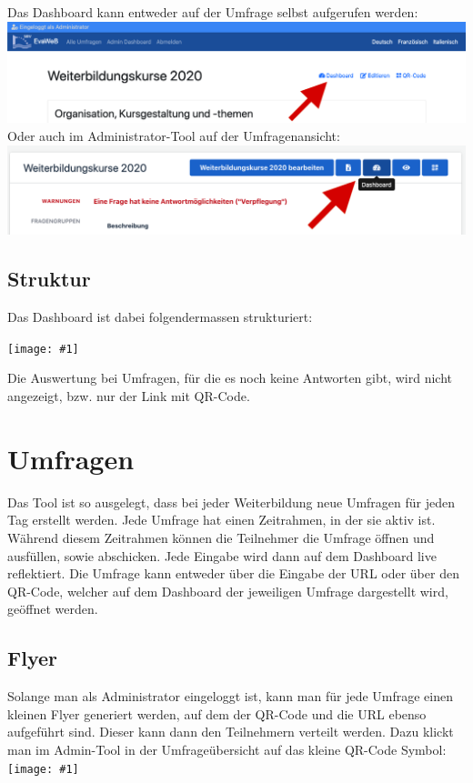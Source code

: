 \documentclass{article}
\newcommand{\inlineimage}[1]{
    \texttt{[image: \#1]}
}
\begin{document}
\begin{flushleft}
Das Dashboard kann entweder auf der Umfrage selbst aufgerufen werden:
\\[0.2cm]
\includegraphics[width=\textwidth]{images/dashboard_link_beispiel_1.png}
\\[0.7cm]
Oder auch im Administrator-Tool auf der Umfragenansicht:
\\[0.2cm]
\includegraphics[width=\textwidth]{images/dashboard_link_beispiel_2.png}
\end{flushleft}

\subsection{Struktur}
Das Dashboard ist dabei folgendermassen strukturiert:

\inlineimage{images/survey.png}
Die Auswertung bei Umfragen, für die es noch keine Antworten gibt, wird nicht angezeigt, bzw. nur der Link mit QR-Code.


\pagebreak
\section{Umfragen}
Das Tool ist so ausgelegt, dass bei jeder Weiterbildung neue Umfragen für jeden Tag erstellt werden. 
Jede Umfrage hat einen Zeitrahmen, in der sie aktiv ist. 
Während diesem Zeitrahmen können die Teilnehmer die Umfrage öffnen und ausfüllen, sowie abschicken.
Jede Eingabe wird dann auf dem Dashboard live reflektiert.
Die Umfrage kann entweder über die Eingabe der URL oder über den QR-Code, welcher auf dem Dashboard der jeweiligen Umfrage
dargestellt wird, geöffnet werden. 

\pagebreak
\subsection{Flyer}
Solange man als Administrator eingeloggt ist, kann man für jede Umfrage einen kleinen Flyer generiert werden, 
auf dem der QR-Code und die URL ebenso aufgeführt sind. Dieser kann dann den Teilnehmern verteilt werden.
Dazu klickt man im Admin-Tool in der Umfrageübersicht auf das kleine QR-Code Symbol:
\\[0.2cm]
\inlineimage{images/dashboard_link_beispiel3.png}
\end{document}
